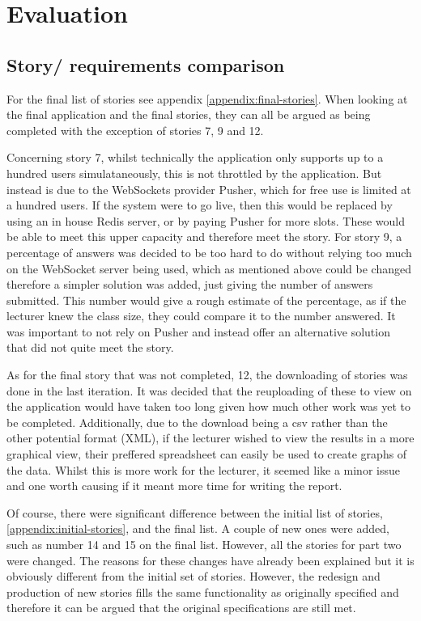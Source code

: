 \chapter{Evaluation}
\section{Story/ requirements comparison}
For the final list of stories see appendix \ref{appendix:final-stories}. When looking at the final application and the final stories, they can all be argued as being completed with the exception of stories 7, 9 and 12. 

Concerning story 7, whilst technically the application only supports up to a hundred users simulataneously, this is not throttled by the application. But instead is due to the WebSockets provider Pusher, which for free use is limited at a hundred users. If the system were to go live, then this would be replaced by using an in house Redis server, or by paying Pusher for more slots. These would be able to meet this upper capacity and therefore meet the story. For story 9, a percentage of answers was decided to be too hard to do without relying too much on the WebSocket server being used, which as mentioned above could be changed therefore a simpler solution was added, just giving the number of answers submitted. This number would give a rough estimate of the percentage, as if the lecturer knew the class size, they could compare it to the number answered. It was important to not rely on Pusher and instead offer an alternative solution that did not quite meet the story.

As for the final story that was not completed, 12, the downloading of stories was done in the last iteration. It was decided that the reuploading of these to view on the application would have taken too long given how much other work was yet to be completed. Additionally, due to the download being a csv rather than the other potential format (XML), if the lecturer wished to view the results in a more graphical view, their preffered spreadsheet can easily be used to create graphs of the data. Whilst this is more work for the lecturer, it seemed like a minor issue and one worth causing if it meant more time for writing the report.

Of course, there were significant difference between the initial list of stories, \ref{appendix:initial-stories}, and the final list. A couple of new ones were added, such as number 14 and 15 on the final list. However, all the stories for part two were changed. The reasons for these changes have already been explained but it is obviously different from the initial set of stories. However, the redesign and production of new stories fills the same functionality as originally specified and therefore it can be argued that the original specifications are still met.

